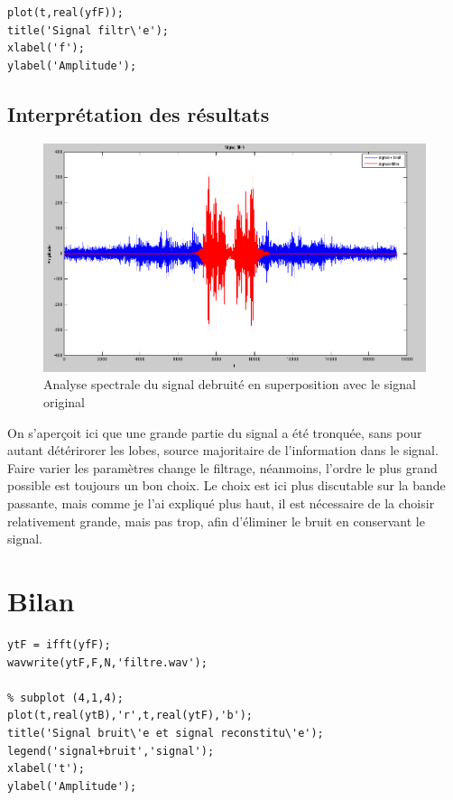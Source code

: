 \documentclass[a4paper, oneside]{report}
\begin{document}
\begin{lstlisting}
plot(t,real(yfF));
title('Signal filtr\'e');
xlabel('f');
ylabel('Amplitude');
\end{lstlisting}
 
 \newpage{}
 
 \section{Interpr\'etation des r\'esultats}
 
 \begin{figure}[h]
 \centering
 \includegraphics[scale=0.42]{images/filtre.png}
 \caption{Analyse spectrale du signal  debruit\'e en superposition avec le signal original}
 \end{figure}
  
 On s'aper\c coit ici que une grande partie du signal a \'et\'e tronqu\'ee, sans pour autant d\'et\'erirorer les lobes, source majoritaire de l'information dans le signal.\\
 
 
 Faire varier les param\`etres change le filtrage, n\'eanmoins, l'ordre le plus grand possible est toujours un bon choix. Le choix est ici plus discutable sur la bande passante, mais comme je l'ai expliqu\'e plus haut, il est n\'ecessaire de la choisir relativement grande, mais pas trop, afin d'\'eliminer le bruit en conservant le signal.

 \chapter{Bilan}
 
\begin{lstlisting}
ytF = ifft(yfF);
wavwrite(ytF,F,N,'filtre.wav');

% subplot (4,1,4);
plot(t,real(ytB),'r',t,real(ytF),'b');
title('Signal bruit\'e et signal reconstitu\'e');
legend('signal+bruit','signal');
xlabel('t');
ylabel('Amplitude');
\end{lstlisting}
\end{document}
